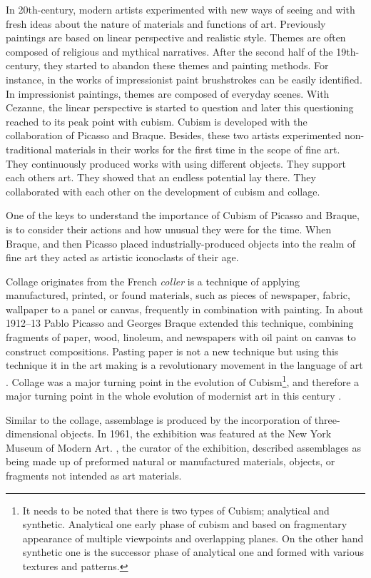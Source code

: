 In 20th-century, modern artists experimented with new ways of seeing and with fresh ideas about the nature of materials and functions of art. Previously paintings are based on linear perspective and realistic style. Themes are often composed of religious and mythical narratives. After the second half of the 19th-century, they started to abandon these themes and painting methods. For instance, in the works of impressionist paint brushstrokes can be easily identified. In impressionist paintings, themes are composed of everyday scenes. With Cezanne, the linear perspective is started to question and later this questioning reached to its peak point with cubism. Cubism is developed with the collaboration of Picasso and Braque. Besides, these two artists experimented non-traditional materials in their works for the first time in the scope of fine art. They continuously produced works with using different objects. They support each others art. They showed that an endless potential lay there. They collaborated with each other on the development of cubism and collage.

One of the keys to understand the importance of Cubism of Picasso and Braque, is to consider their actions and how unusual they were for the time. When Braque, and then Picasso placed industrially-produced objects into the realm of fine art they acted as artistic iconoclasts of their age.

Collage originates from the French \textit{coller} is a technique of applying manufactured, printed, or found materials, such as pieces of newspaper, fabric, wallpaper to a panel or canvas, frequently in combination with painting. In about 1912–13 Pablo Picasso and Georges Braque extended this technique, combining fragments of paper, wood, linoleum, and newspapers with oil paint on canvas to construct compositions. Pasting paper is not a new technique but using this technique it in the art making is a revolutionary movement in the language of art \citep{waldman1992collage}. Collage was a major turning point in the evolution of Cubism\footnote{It needs to be noted that there is two types of Cubism; analytical and synthetic. Analytical one early phase of cubism and based on fragmentary appearance of multiple viewpoints and overlapping planes. On the other hand synthetic one is the successor phase of analytical one and formed with various textures and patterns.}, and therefore a major turning point in the whole evolution of modernist art in this century \citep{greenberg1984collage}.

Similar to the collage, assemblage is produced by the incorporation of three-dimensional objects. In 1961, the exhibition  was featured at the New York Museum of Modern Art. \cite{seitz1961art}, the curator of the exhibition, described assemblages as being made up of preformed natural or manufactured materials, objects, or fragments not intended as art materials.

